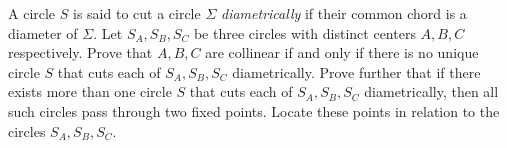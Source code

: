 A circle $S$ is said to cut a circle $\Sigma$ \emph{diametrically} if their common chord is a diameter of $\Sigma$. Let $S_A, S_B, S_C$ be three circles with distinct centers $A, B, C$ respectively. Prove that $A, B, C$ are collinear if and only if there is no unique circle $S$ that cuts each of $S_A, S_B, S_C$ diametrically. Prove further that if there exists more than one circle $S$ that cuts each of $S_A, S_B, S_C$ diametrically, then all such circles pass through two fixed points. Locate these points in relation to the circles $S_A, S_B, S_C$.
